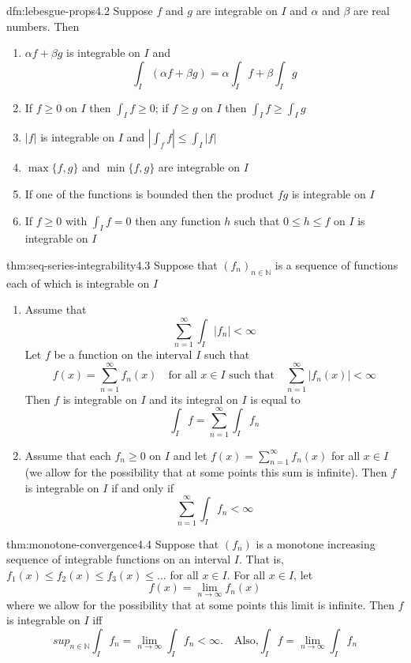 \documentclass[landscape, 8pt]{extarticle}
\begin{document}
\begin{multicols}{3}
\newpage
\begin{thm}{dfn:lebesgue-props}{4.2}
	Suppose $f$ and $g$ are integrable on $I$ and $\alpha$ and $\beta$ are real numbers. Then
	\begin{enumerate}
		\setlength\itemsep{0em}
		\item $\alpha f + \beta g$ is integrable on $I$ and
		\[\int_{I} (\alpha f + \beta g)=\alpha\int_{I} f+\beta\int_{I} g\]
		\item If $f\ge 0$ on $I$ then $\int_{I}f\ge 0$; if $f\ge g$ on $I$ then $\int_{I}f\ge \int_{I}g$
		\item $\lvert f \rvert$ is integrable on $I$ and $\left\lvert  \int_{f}f  \right\rvert\le \int_{I}\lvert f \rvert$
		\item $\max\{f,g\}$ and $\min\{f,g\}$ are integrable on $I$
		\item If one of the functions is bounded then the product $fg$ is integrable on $I$
		\item If $f\ge 0$ with $\int_{I}f=0$ then any function $h$ such that $0\le h\le f$ on $I$ is integrable on $I$
	\end{enumerate}
\end{thm}

\begin{thm}{thm:seq-series-integrability}{4.3}
	Suppose that $(f_{n})_{n\in\mathbb{N}}$ is a sequence of functions each of which is integrable on $I$
	\begin{enumerate}
		\setlength\itemsep{0em}
		\item Assume that
		\[\sum_{n=1}^{\infty} \int_{I} \lvert f_{n} \rvert <\infty\]
		Let $f$ be a function on the interval $I$ such that
		\[f(x)=\sum_{n=1}^{\infty} f_{n}(x)\quad\text{for all } x\in I\text{ such that}\quad \sum_{n=1}^{\infty} \lvert f_{n}(x) \rvert <\infty\]
		Then $f$ is integrable on $I$ and its integral on $I$ is equal to
		\[\int_{I} f=\sum_{n=1}^{\infty} \int_{I} f_{n}\]
		\item Assume that each $f_{n}\ge 0$ on $I$ and let $f(x)=\sum_{n=1}^{\infty}f_{n}(x)$ for all $x\in I$ (we allow for the possibility that at some points this sum is infinite). Then $f$ is integrable on $I$ if and only if
		\[\sum_{n=1}^{\infty} \int_{I} f_{n}<\infty\]
	\end{enumerate}
\end{thm}

\begin{thm}{thm:monotone-convergence}{4.4}
	Suppose that $(f_{n})$ is a monotone increasing sequence of integrable functions on an interval $I$. That is, $f_{1}(x) \le f_{2}(x) \le f_{3}(x) \le \dots$ for all $x\in I$. For all $x\in I$, let
	\[f(x) = \lim_{n\to \infty} f_{n}(x)\]
	where we allow for the possibility that at some points this limit is infinite. Then $f$ is integrable on $I$ iff
	\[sup_{n\in \mathbb{N}} \int_{I} f_{n} = \lim_{n\to \infty} \int_{I} f_{n} < \infty. \quad \text{Also,} \int_{I} f = \lim_{n\to \infty} \int_{I} f_{n}\]
\end{thm}




\end{multicols}
\end{document}
